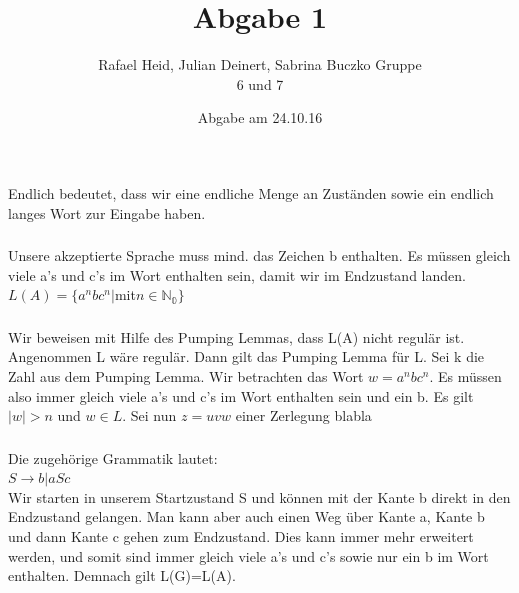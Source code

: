 \documentclass[a4paper,12pt]{scrartcl}
\title{Abgabe 1}
\author{Rafael Heid, Julian Deinert, Sabrina Buczko Gruppe\\ 6 und 7}
\date{Abgabe am 24.10.16}
\begin{document}
\maketitle
\newpage
\setcounter{section}{0}

\section{}
\setcounter{subsection}{3}
\subsection{}
\subsubsection{}
Endlich bedeutet, dass wir eine endliche Menge an Zuständen sowie ein endlich langes Wort zur Eingabe haben.
\subsubsection{}
Unsere akzeptierte Sprache muss mind. das Zeichen b enthalten. Es müssen gleich viele a's und c's im Wort enthalten sein, damit wir im Endzustand landen.\\
$L(A)=\{a^{n}bc^{n} | $mit$ n\in \mathds{N_{0}}\}$
\subsubsection{}
Wir beweisen mit Hilfe des Pumping Lemmas, dass L(A) nicht regulär ist.\\
Angenommen L wäre regulär. Dann gilt das Pumping Lemma für L. Sei k die Zahl aus dem Pumping Lemma. Wir betrachten das Wort $w=a^{n}bc^{n}$. Es müssen also immer gleich viele a's und c's im Wort enthalten sein und ein b. Es gilt $|w|>n$ und $w\in L.$ Sei nun $z=uvw$ einer Zerlegung blabla
\subsubsection{}
Die zugehörige Grammatik lautet:\\
$S\rightarrow b | aSc$\\
Wir starten in unserem Startzustand S und können mit der Kante b direkt in den Endzustand gelangen. Man kann aber auch einen Weg über Kante a, Kante b und dann Kante c gehen zum Endzustand. Dies kann immer mehr erweitert werden, und somit sind immer gleich viele a's und c's sowie nur ein b im Wort enthalten. Demnach gilt L(G)=L(A).
\end{document}

